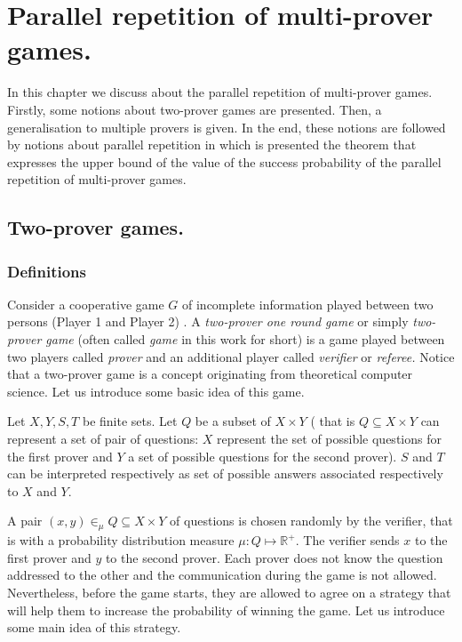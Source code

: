 \chapter{Parallel repetition of multi-prover games.}


In this chapter we discuss about the parallel repetition of multi-prover games. Firstly, some notions about two-prover games are presented. Then, a generalisation to multiple  provers is given. In the end, these notions are followed by notions about parallel repetition in which is presented the theorem that expresses the upper bound of the value of the success probability of the parallel repetition of multi-prover games.


\section{Two-prover games.}


\subsection{Definitions} \label{tpg}

Consider a cooperative game $G$  of incomplete information played between two persons  (Player 1 and Player 2) 
\citep{ben1988multi, verbitsky1996towards, raz2010parallel}.
A \textit{two-prover one round  game} or simply \textit{two-prover game} (often called \textit{game} in this work for short) is a game played between two players called \textit{prover} and an additional player called \textit{verifier} or \textit{referee.}
Notice that a two-prover game is a concept originating from theoretical computer science. Let us introduce some basic idea of this game.

Let $X, Y, S, T$ be  finite sets. Let $Q$ be a subset of $X\times Y$ ( that is $Q \subseteq X \times Y$ can represent a set of pair of questions: $X$ represent the set of possible questions for the first prover and $Y$ a set of possible questions for the second prover).    $S$ and $T$ can be interpreted respectively as set of possible answers associated respectively to $X$ and $Y$.

A pair $(x,y) \in_{\mu} Q \subseteq X\times Y$ of questions is chosen randomly  by the verifier, that is with a probability distribution measure $\mu: Q \longmapsto \mathbb{R}^+.$
The verifier sends $x$ to the first prover and $y$ to the second prover. Each prover does not know the question addressed to the other and the communication during the game is not allowed. Nevertheless, before the game starts, they are allowed to agree on a strategy that will help them to increase the probability of winning the game. Let us introduce some main idea of this strategy. 

